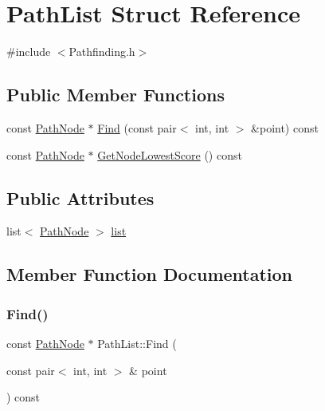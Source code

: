 \hypertarget{struct_path_list}{}\section{Path\+List Struct Reference}
\label{struct_path_list}


{\ttfamily \#include $<$Pathfinding.\+h$>$}

\subsection*{Public Member Functions}
\begin{DoxyCompactItemize}
\item 
const \mbox{\hyperlink{struct_path_node}{Path\+Node}} $\ast$ \mbox{\hyperlink{struct_path_list_a09bae923ccdd6fe5dc2fb482fefff754}{Find}} (const pair$<$ int, int $>$ \&point) const
\item 
const \mbox{\hyperlink{struct_path_node}{Path\+Node}} $\ast$ \mbox{\hyperlink{struct_path_list_abd63a84c3d60b40334427f1698b170de}{Get\+Node\+Lowest\+Score}} () const
\end{DoxyCompactItemize}
\subsection*{Public Attributes}
\begin{DoxyCompactItemize}
\item 
list$<$ \mbox{\hyperlink{struct_path_node}{Path\+Node}} $>$ \mbox{\hyperlink{struct_path_list_a7ec3d845ad003ce8a99d081a2add8f6b}{list}}
\end{DoxyCompactItemize}


\subsection{Member Function Documentation}
\mbox{\label{struct_path_list_a09bae923ccdd6fe5dc2fb482fefff754}} 
\subsubsection{\texorpdfstring{Find()}{Find()}}
{\footnotesize\ttfamily const \mbox{\hyperlink{struct_path_node}{Path\+Node}} $\ast$ Path\+List\+::\+Find (\begin{DoxyParamCaption}\item[{const pair$<$ int, int $>$ \&}]{point }\end{DoxyParamCaption}) const}

